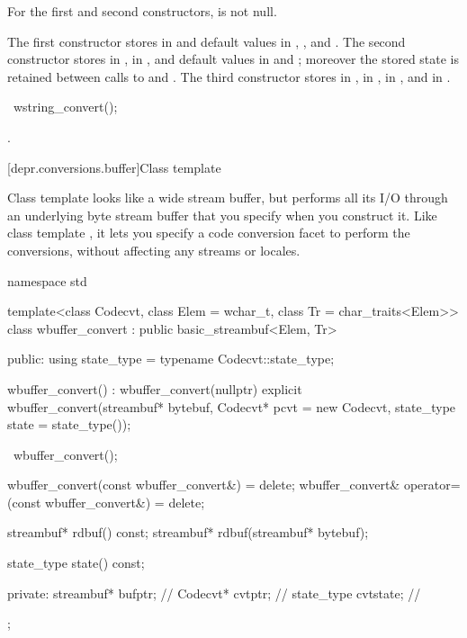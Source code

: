 \begin{itemdescr}
\pnum
\expects
For the first and second constructors,  is not null.

\pnum
\effects
The first constructor stores  in  and
default values in , , and
.
The second constructor stores  in ,
 in , and default values in
 and ; moreover the
stored state is retained between calls to  and
.
The third constructor stores  in ,
 in , 
in , and  in
.
\end{itemdescr}

%
\begin{itemdecl}
~wstring_convert();
\end{itemdecl}

\begin{itemdescr}
\pnum
\effects
{}.
\end{itemdescr}

[depr.conversions.buffer]{Class template }

\pnum
Class template  looks like a wide stream buffer, but
performs all its I/O through an underlying byte stream buffer that you
specify when you construct it. Like class template , it
lets you specify a code conversion facet to perform the conversions,
without affecting any streams or locales.

%
%
\begin{codeblock}
namespace std {
  template<class Codecvt, class Elem = wchar_t, class Tr = char_traits<Elem>>
    class wbuffer_convert : public basic_streambuf<Elem, Tr> {
    public:
      using state_type = typename Codecvt::state_type;

      wbuffer_convert() : wbuffer_convert(nullptr) {}
      explicit wbuffer_convert(streambuf* bytebuf,
                               Codecvt* pcvt = new Codecvt,
                               state_type state = state_type());

      ~wbuffer_convert();

      wbuffer_convert(const wbuffer_convert&) = delete;
      wbuffer_convert& operator=(const wbuffer_convert&) = delete;

      streambuf* rdbuf() const;
      streambuf* rdbuf(streambuf* bytebuf);

      state_type state() const;

    private:
      streambuf* bufptr;            // \expos
      Codecvt* cvtptr;              // \expos
      state_type cvtstate;          // \expos
  };
}
\end{codeblock}


